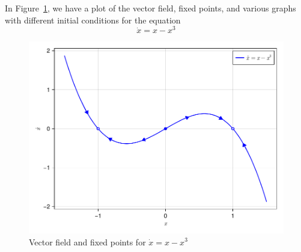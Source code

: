 
In Figure~\ref{fig2_2_3vecfield}, we have a plot of the vector field, fixed points,
and various graphs with different initial conditions for the equation 
\[
    \dot{x} = x - x^3
\]
\begin{figure}[!ht]
    \includegraphics[scale=0.6, center]{../plots/ch02/ex2_2_3.pdf}
    \caption{Vector field and fixed points for $\dot{x} = x - x^3$\label{fig2_2_3vecfield}}
\end{figure}

